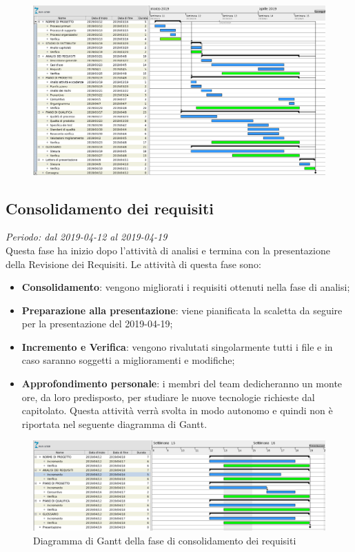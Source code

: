 \begin{figure}[H]
	\includegraphics[width=0.99\linewidth]{res/images/gantt_analisi.png}
	
\end{figure}


\subsection{Consolidamento dei requisiti}
\textit{Periodo: dal 2019-04-12 al 2019-04-19} \\
Questa fase ha inizio dopo l'attività di analisi e termina con la presentazione della Revisione dei Requisiti. Le attività 
di questa fase sono:
\begin{itemize}
	\item \textbf{Consolidamento}: vengono migliorati i requisiti ottenuti nella fase di analisi;
	\item \textbf{Preparazione alla presentazione}: viene pianificata la scaletta da seguire per la presentazione del 2019-04-19;
	\item \textbf{Incremento e Verifica}: vengono rivalutati singolarmente tutti i file e in caso saranno soggetti a miglioramenti e modifiche;
	\item \textbf{Approfondimento personale}: i membri del team dedicheranno un monte ore, da loro predisposto, per studiare le nuove tecnologie richieste dal capitolato\glo. Questa attività verrà svolta in modo autonomo e quindi non è riportata nel seguente diagramma di Gantt\glo.
\end{itemize}

\begin{figure}[H]
	\includegraphics[width=0.99\linewidth]{res/images/gantt_cons.png}
	\caption{Diagramma di Gantt della fase di consolidamento dei requisiti}
\end{figure}

